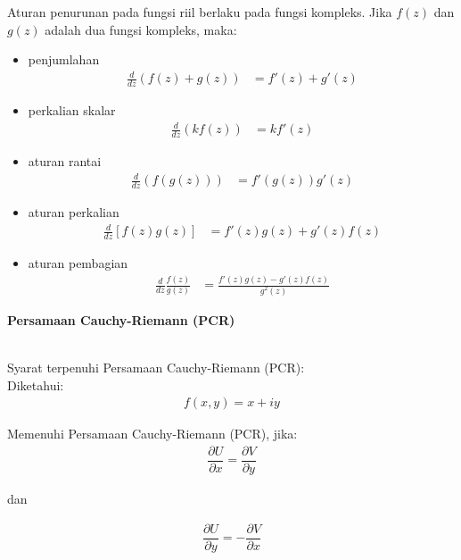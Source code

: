 \documentclass{article}
\begin{document}
    Aturan penurunan pada fungsi riil berlaku pada fungsi kompleks. Jika $f(z)$ dan $g(z)$ adalah dua fungsi kompleks, maka:
    \begin{itemize}
        \item penjumlahan
        \begin{align}
            \frac{d}{dz}(f(z)+g(z)) &= f'(z) + g'(z)
        \end{align}
        \item perkalian skalar
        \begin{align}
            \frac{d}{dz}(kf(z)) &= kf'(z)
        \end{align}
        \item aturan rantai
        \begin{align}
            \frac{d}{dz}(f(g(z))) &= f'(g(z)) g'(z)
        \end{align}
        \item aturan perkalian
        \begin{align}
            \frac{d}{dz}[f(z)g(z)] &= f'(z)g(z) + g'(z)f(z)
        \end{align}
        \item aturan pembagian
        \begin{align}
            \frac{d}{dz}\frac{f(z)}{g(z)} &= \frac{f'(z)g(z) - g'(z)f(z)}{g^2(z)}
        \end{align}
    \end{itemize}

    \newpage
    \begin{center}
        \textbf{Persamaan Cauchy-Riemann (PCR)}
    \end{center}
    \leavevmode\\

    Syarat terpenuhi Persamaan Cauchy-Riemann (PCR):\\

    Diketahui:
    \begin{align}
        f(x,y) = x + iy
        \nonumber
    \end{align}
    
    Memenuhi Persamaan Cauchy-Riemann (PCR), jika:
    \begin{align}
        \dfrac{\partial U}{\partial x} = \dfrac{\partial V}{\partial y}
    \end{align}
    \begin{center}
        dan
    \end{center}
    \begin{align}
        \dfrac{\partial U}{\partial y} = -\dfrac{\partial V}{\partial x}
    \end{align}
\end{document}
